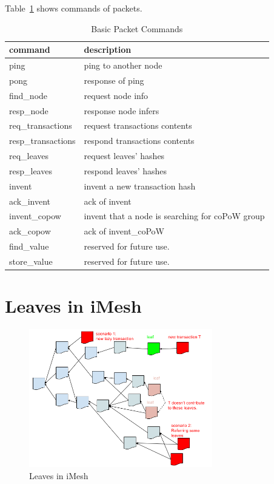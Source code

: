 \documentclass[a4paper,10pt,twocolumn]{article}
\begin{document}
Table~\ref{tbl:cmd} shows commands of packets.


 \begin{table}[htb]
	\caption{Basic Packet Commands}
    \label{tbl:cmd}
	\begin{tabularx}{\linewidth}{XX} 
		command & description \\
		\toprule
  ping & ping to another node \\
  pong & response of ping \\
  find\_node & request node info\\
    resp\_node & response node infers \\
  req\_transactions & request transactions contents \\
  resp\_transactions & respond transactions contents \\
  req\_leaves & request  leaves' hashes \\
  resp\_leaves &  respond leaves' hashes \\
  invent &  invent a new transaction hash \\
  ack\_invent & ack of invent \\
  invent\_copow & invent that a node is searching for coPoW group \\
  ack\_copow & ack of invent\_coPoW \\
  find\_value &  reserved for future use.\\
  store\_value & reserved for future use.\\
  \bottomrule
\end{tabularx}
  \end{table}


\section{Leaves in iMesh}
\label{sec:leaves}

\begin{figure}[ht]
	\begin{center}
	\includegraphics[width=80mm]{leaves.png}
	  \caption{Leaves in iMesh}
    \label{fig:leaves}
	\end{center}
 \end{figure}
\end{document}
